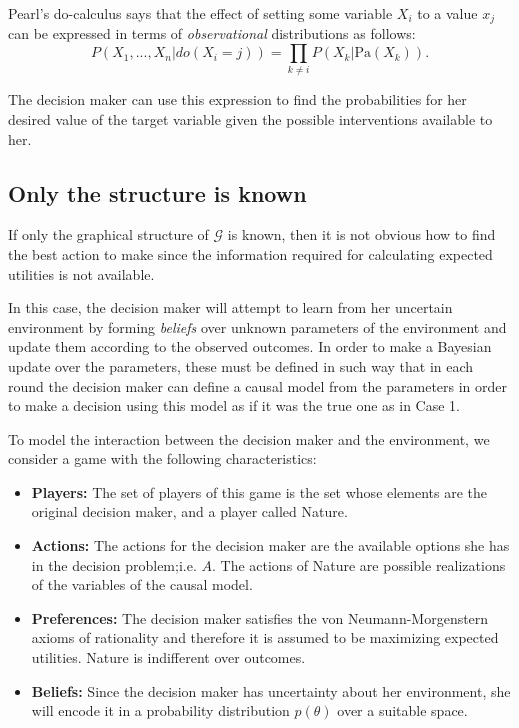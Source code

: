 \documentclass{article}
\begin{document}
Pearl's do-calculus \cite{pearl2009causality} says that the effect of setting some variable $X_i$ to a value $x_j$ can be expressed in terms of \textit{observational} distributions as follows:
\[ P(X_1,...,X_n | do(X_i = j )) = \prod_{k \neq i} P(X_k | \textrm{Pa}(X_k)). \]

The decision maker can use this expression to find the probabilities for her desired value of the target variable given the possible interventions available to her.

\subsection{Only the structure is known}
If only the graphical structure of $\mathcal{G}$ is known, then it is not obvious how to find the best action to make since the information required for calculating expected utilities is not available.

In this case, the decision maker will attempt to learn from her uncertain environment by forming \textit{beliefs} over unknown parameters of the environment and update them according to the observed outcomes. In order to make a Bayesian update over the parameters, these must be defined in such way that in each round the decision maker can define a causal model from the parameters in order to make a decision using this model as if it was the true one as in Case 1.

To model the interaction between the decision maker and the environment, we consider a game with the following characteristics:
\begin{itemize}
\item \textbf{Players:} The set of players of this game is the set whose elements are the original decision maker, and a player called Nature.
\item \textbf{Actions:} The actions for the decision maker are the available options she has in the decision problem;i.e. $A$. The actions of Nature are possible realizations of the variables of the causal model. 
\item \textbf{Preferences:} The decision maker satisfies the von Neumann-Morgenstern axioms of rationality and therefore it is assumed to be maximizing expected utilities. Nature is indifferent over outcomes.
\item \textbf{Beliefs:} Since the decision maker has uncertainty about her environment, she will encode it in a probability distribution $p(\theta)$ over a suitable space.
\end{itemize}
\end{document}

